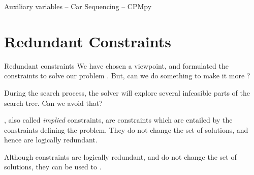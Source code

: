 \documentclass{cons-beamer}
\begin{document}
\begin{flashcardcpmpy}
\begin{frame}{Auxiliary variables -- Car Sequencing -- CPMpy}
  \begin{example}
    
  \end{example}
\end{frame}
\end{flashcardcpmpy}


\section{Redundant Constraints}

\begin{frame}{Redundant constraints}
  We have chosen a viewpoint, and formulated the constraints to solve our problem . But, can we do something to make it more ?
  \vfill

  During the search process, the solver will explore several infeasible parts of the search tree. Can we avoid that?
  \vfill

  \begin{definition}
    , also called \textit{implied} constraints, are constraints which are entailed by the constraints defining the problem. They do not change the set of solutions, and hence are logically redundant.
  \end{definition}
  \vfill

  Although  constraints are logically redundant, and do not change the set of solutions, they can be used to . 
\end{frame}
\end{document}

